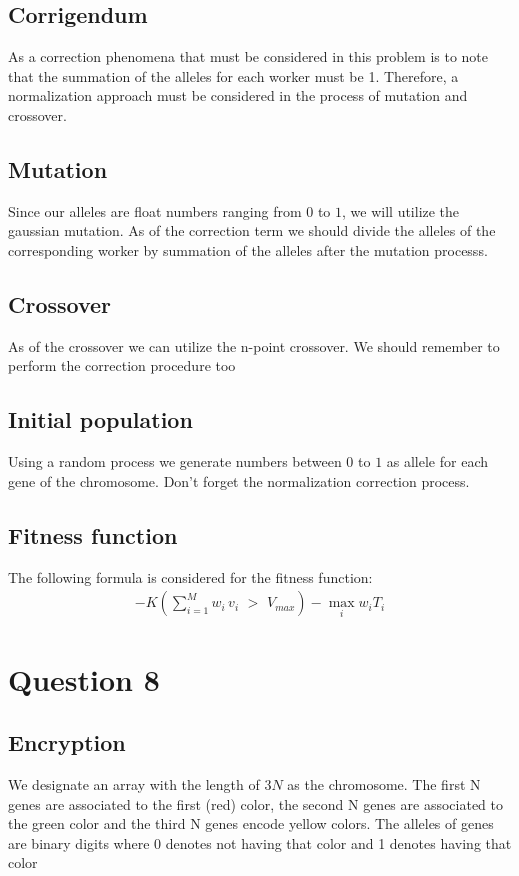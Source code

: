 \documentclass[]{article}
\begin{document}
 	\subsection*{Corrigendum}
 	As a correction phenomena that must be considered in this problem is to note that the summation of the alleles for each worker must be 1. Therefore, a normalization approach must be considered in the process of mutation and crossover.
 	
 	\subsection*{Mutation}
 	Since our alleles are float numbers ranging from $0$ to $1$, we will utilize the gaussian mutation. As of the correction term we should divide the alleles of the corresponding worker by summation of the alleles after the mutation processs.
 	
 	\subsection*{Crossover}
 	As of the crossover we can utilize the n-point crossover. We should remember to perform the correction procedure too
 	
 	\subsection*{Initial population}
 	Using a random process we generate numbers between $0$ to $1$ as allele for each gene of the chromosome. Don't forget the normalization correction process.
 	
 	\subsection*{Fitness function}
 	The following formula is considered for the fitness function:
 	\begin{align*}
 		-K \left(\sum_{i=1}^{M} w_i \, v_i \, \, > \,\, V_{max}\right) - \max_i w_iT_i
 	\end{align*}
 	 
 	 \section{Question 8}
 	 \subsection*{Encryption}
 	 We designate an array with the length of $3N$ as the chromosome. The first N genes are associated to the first (red) color, the second N genes are associated to the green color and the third N genes encode yellow colors. The alleles of genes are binary digits where 0 denotes not having that color and 1 denotes having that color
 	 
\end{document}
